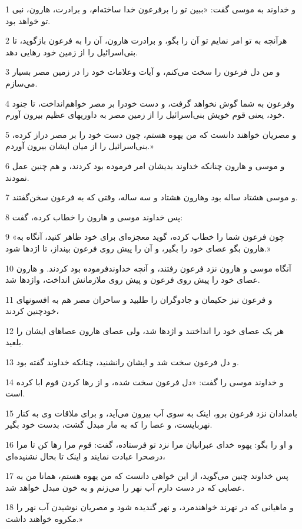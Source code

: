 \par 1 و خداوند به موسی گفت: «ببین تو را برفرعون خدا ساخته‌ام، و برادرت، هارون، نبی تو خواهد بود.
\par 2 هرآنچه به تو امر نمایم تو آن را بگو، و برادرت هارون، آن را به فرعون بازگوید، تا بنی‌اسرائیل را از زمین خود رهایی دهد.
\par 3 و من دل فرعون را سخت می‌کنم، و آیات وعلامات خود را در زمین مصر بسیار می‌سازم.
\par 4 وفرعون به شما گوش نخواهد گرفت، و دست خودرا بر مصر خواهم‌انداخت، تا جنود خود، یعنی قوم خویش بنی‌اسرائیل را از زمین مصر به داوریهای عظیم بیرون آورم.
\par 5 و مصریان خواهند دانست که من یهوه هستم، چون دست خود را بر مصر دراز کرده، بنی‌اسرائیل را از میان ایشان بیرون آوردم.»
\par 6 و موسی و هارون چنانکه خداوند بدیشان امر فرموده بود کردند، و هم چنین عمل نمودند.
\par 7 و موسی هشتاد ساله بود وهارون هشتاد و سه ساله، وقتی که به فرعون سخن‌گفتند.
\par 8 پس خداوند موسی و هارون را خطاب کرده، گفت:
\par 9 «چون فرعون شما را خطاب کرده، گوید معجزه‌ای برای خود ظاهر کنید، آنگاه به هارون بگو عصای خود را بگیر، و آن را پیش روی فرعون بینداز، تا اژدها شود.»
\par 10 آنگاه موسی و هارون نزد فرعون رفتند، و آنچه خداوندفرموده بود کردند. و هارون عصای خود را پیش روی فرعون و پیش روی ملازمانش انداخت، واژدها شد.
\par 11 و فرعون نیز حکیمان و جادوگران را طلبید و ساحران مصر هم به افسونهای خودچنین کردند،
\par 12 هر یک عصای خود را انداختند و اژدها شد، ولی عصای هارون عصاهای ایشان را بلعید.
\par 13 و دل فرعون سخت شد و ایشان رانشنید، چنانکه خداوند گفته بود.
\par 14 و خداوند موسی را گفت: «دل فرعون سخت شده، و از رها کردن قوم ابا کرده است.
\par 15 بامدادان نزد فرعون برو، اینک به سوی آب بیرون می‌آید، و برای ملاقات وی به کنار نهربایست، و عصا را که به مار مبدل گشت، بدست خود بگیر.
\par 16 و او را بگو: یهوه خدای عبرانیان مرا نزد تو فرستاده، گفت: قوم مرا رها کن تا مرا درصحرا عبادت نمایند و اینک تا بحال نشنیده‌ای،
\par 17 پس خداوند چنین می‌گوید، از این خواهی دانست که من یهوه هستم، همانا من به عصایی که در دست دارم آب نهر را می‌زنم و به خون مبدل خواهد شد.
\par 18 و ماهیانی که در نهرند خواهندمرد، و نهر گندیده شود و مصریان نوشیدن آب نهر را مکروه خواهند داشت.»
